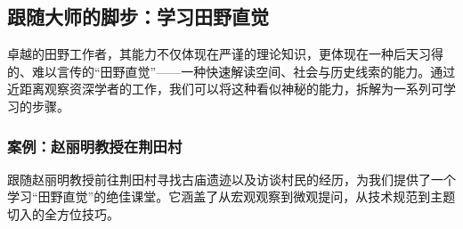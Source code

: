 \documentclass[UTF8]{ctexart}
\begin{document}
\subsection{跟随大师的脚步：学习田野直觉}
卓越的田野工作者，其能力不仅体现在严谨的理论知识，更体现在一种后天习得的、难以言传的“田野直觉”——一种快速解读空间、社会与历史线索的能力。通过近距离观察资深学者的工作，我们可以将这种看似神秘的能力，拆解为一系列可学习的步骤。

\subsubsection{案例：赵丽明教授在荆田村}
跟随赵丽明教授前往荆田村寻找古庙遗迹以及访谈村民的经历，为我们提供了一个学习“田野直觉”的绝佳课堂。它涵盖了从宏观观察到微观提问，从技术规范到主题切入的全方位技巧。
\end{document}
